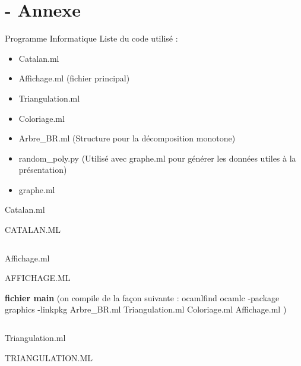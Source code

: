 \documentclass{beamer}
\begin{document}
\section{- Annexe}
\begin{frame}{Programme Informatique}
    Liste du code utilisé : \newline \newline
    \begin{itemize}
        \item Catalan.ml
        \item Affichage.ml (fichier principal)
        \item Triangulation.ml
        \item Coloriage.ml
        \item Arbre\_BR.ml (Structure pour la décomposition monotone)
        \item random\_poly.py (Utilisé avec graphe.ml pour générer les données utiles à la présentation)
        \item graphe.ml
    \end{itemize}
\end{frame}
\begin{frame}{Catalan.ml}
    \begin{center}
        CATALAN.ML
    \end{center}    
\end{frame}
\inputminted[obeytabs=true,tabsize=2, breaklines, linenos, fontsize=\tiny]{ocaml}{Catalan.ml}

\begin{frame}{Affichage.ml}
    \begin{center}
        AFFICHAGE.ML
    \end{center}    
    \newline\newline 
    \textbf{fichier main} (on compile de la façon suivante : ocamlfind ocamlc -package graphics -linkpkg Arbre\_BR.ml Triangulation.ml Coloriage.ml Affichage.ml )
\end{frame}
\inputminted[obeytabs=true,tabsize=2, breaklines, linenos, fontsize=\tiny]{ocaml}{Affichage.ml}

\begin{frame}{Triangulation.ml}
    \begin{center}
        TRIANGULATION.ML 
    \end{center}    
\end{frame}
\inputminted[obeytabs=true,tabsize=2, breaklines, linenos, fontsize=\tiny]{ocaml}{Triangulation.ml}
\end{document}

